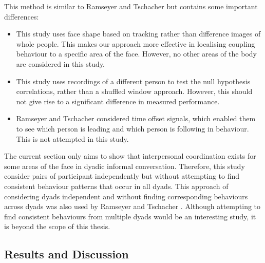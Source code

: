 
This method is similar to Ramseyer and Tschacher \cite{Ramseyer2008} but contains some important differences:
\begin{itemize}
 \item This study uses face shape based on tracking rather than difference images of whole people. This makes our approach more effective in localising coupling behaviour to a specific area of the face. However, no other areas of the body are considered in this study.
 \item This study uses recordings of a different person to test the null hypothesis correlations, rather than a shuffled window approach. However, this should not give rise to a significant difference in measured performance.
 \item Ramseyer and Tschacher considered time offset signals, which enabled them to see which person is leading and which person is following in behaviour. This is not attempted in this study.
\end{itemize}

The current section only aims to show that interpersonal coordination exists for some areas of the face in dyadic informal conversation. Therefore, this study consider pairs of participant independently but without attempting to find consistent behaviour patterns that occur in all dyads. This approach of considering dyads independent and without finding corresponding behaviours across dyads was also used by Ramseyer and Tschacher \cite{Ramseyer2008}. 
Although attempting to find consistent behaviours from multiple dyads would be an interesting study, it is beyond the scope of this thesis. 

\subsection{Results and Discussion}
\label{SectionCouplingResults}


